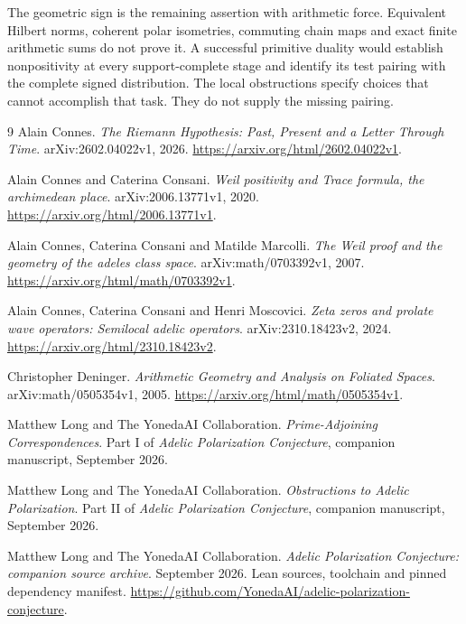 \documentclass[11pt,letterpaper]{article}
\theoremstyle{definition}
\theoremstyle{remark}
\begin{document}
The geometric sign is the remaining assertion with arithmetic
force. Equivalent Hilbert norms, coherent polar isometries,
commuting chain maps and exact finite arithmetic sums do not
prove it. A successful primitive duality would establish
nonpositivity at every support-complete stage and identify its
test pairing with the complete signed distribution. The
local obstructions specify choices that cannot accomplish
that task. They do not supply the missing pairing.

\begin{thebibliography}{9}
\small
{}
Alain Connes.
\emph{The Riemann Hypothesis: Past, Present and a Letter Through Time}.
arXiv:2602.04022v1, 2026.
\url{https://arxiv.org/html/2602.04022v1}.

Alain Connes and Caterina Consani.
\emph{Weil positivity and Trace formula, the archimedean place}.
arXiv:2006.13771v1, 2020.
\url{https://arxiv.org/html/2006.13771v1}.

Alain Connes, Caterina Consani and Matilde Marcolli.
\emph{The Weil proof and the geometry of the adeles class space}.
arXiv:math/0703392v1, 2007.
\url{https://arxiv.org/html/math/0703392v1}.

Alain Connes, Caterina Consani and Henri Moscovici.
\emph{Zeta zeros and prolate wave operators: Semilocal adelic operators}.
arXiv:2310.18423v2, 2024.
\url{https://arxiv.org/html/2310.18423v2}.

Christopher Deninger.
\emph{Arithmetic Geometry and Analysis on Foliated Spaces}.
arXiv:math/0505354v1, 2005.
\url{https://arxiv.org/html/math/0505354v1}.

Matthew Long and The YonedaAI Collaboration.
\emph{Prime-Adjoining Correspondences}.
Part I of \emph{Adelic Polarization Conjecture}, companion manuscript,
September 2026.

Matthew Long and The YonedaAI Collaboration.
\emph{Obstructions to Adelic Polarization}.
Part II of \emph{Adelic Polarization Conjecture}, companion manuscript,
September 2026.

Matthew Long and The YonedaAI Collaboration.
\emph{Adelic Polarization Conjecture: companion source archive}.
September 2026. Lean sources, toolchain and pinned dependency manifest.
\url{https://github.com/YonedaAI/adelic-polarization-conjecture}.
\end{thebibliography}
\end{document}
